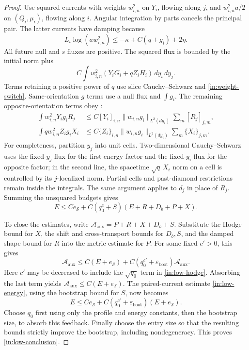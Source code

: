 \begin{proof}
Use squared currents with weights $w_{i,n}^2$ on $Y_i$, flowing
along $j$, and $w_{i,n}^2a/2$ on $(Q_i,\mu_i)$, flowing along $i$.
Angular integration by parts cancels the principal pair. The latter
currents have damping because
\[
 L_i\log(aw_{i,n}^2)
     \le-\kappa+C(q+g_i)+2\eta.
\]
All future null and $s$ fluxes are positive. The squared flux is
bounded by the initial norm plus
\begin{equation}\label{in:paired-current}
 C\int w_{i,n}^2(Y_iG_i+qZ_iH_i)\,dy_i\,dy_j.
\end{equation}
Terms retaining a positive power of $q$ use slice
Cauchy--Schwarz and \eqref{in:weight-switch}. Same-orientation
$g$ terms use a null flux and $\int g_i$. The remaining
opposite-orientation terms obey :
\begin{equation}\label{in:cross-flux}
\begin{aligned}
 \int w_{i,n}^2Y_i g_iR_j
  &\le C[Y_i]_{i,n}\|w_{i,n}g_i\|_{L^2(dy_i)}
                          \sum_m[R_j]_{j,m},\\
 \int q w_{i,n}^2Z_i g_iX_i
  &\le C\{Z_i\}_{i,n}\|w_{i,n}g_i\|_{L^2(dy_i)}
                          \sum_m\{X_i\}_{j,m}.
\end{aligned}
\end{equation}
For completeness, partition $y_j$ into unit cells. Two-dimensional
Cauchy--Schwarz uses the fixed-$y_j$ flux for the first energy factor
and the fixed-$y_i$ flux for the opposite factor; in the second line,
the spacetime $\sqrt q\,X_i$ norm on a cell is controlled by its
$j$-localized norm. Partial cells and past-diamond restrictions remain
inside the integrals. The same argument applies to $d_j$ in place of
$R_j$. Summing the unsquared budgets gives
\begin{equation}\label{in:low-energy}
 E\le Ce_{\mathcal S}
       +C(q_0^c+S)(E+R+D_b+P+X).
\end{equation}

To close the estimates, write
$\mathcal A_{\mathrm{aux}}=P+R+X+D_b+S$.
Substitute the Hodge bound for $X$, the shift and cross-transport
bounds for $D_b,S$, and the damped shape bound for $R$ into the
metric estimate for $P$. For some fixed $c'>0$, this gives
\[
 \mathcal A_{\mathrm{aux}}
 \le C(E+e_{\mathcal S})
      +C(q_0^{c'}+\varepsilon_{\mathrm{boot}})
                      \mathcal A_{\mathrm{aux}}.
\]
Here $c'$ may be decreased to include the $\sqrt{q_0}$ term in
\eqref{in:low-hodge}. Absorbing the last term yields
$\mathcal A_{\mathrm{aux}}\le C(E+e_{\mathcal S})$.
The paired-current estimate \eqref{in:low-energy}, using the
bootstrap bound for $S$, now becomes
\[
 E\le Ce_{\mathcal S}
       +C(q_0^{c'}+\varepsilon_{\mathrm{boot}})
                                      (E+e_{\mathcal S}).
\]
Choose $q_0$ first using only the profile and energy constants,
then the bootstrap size, to absorb this feedback. Finally choose
the entry size so that the resulting bounds strictly improve the
bootstrap, including nondegeneracy. This proves
\eqref{in:low-conclusion}.
\end{proof}

